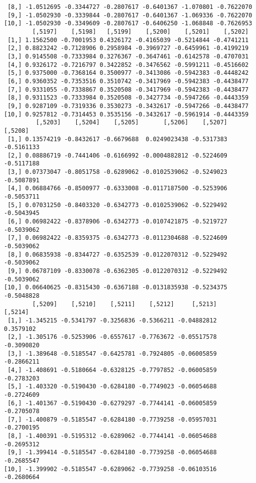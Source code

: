 \documentclass[
  letterpaper,
  DIV=11,
  numbers=noendperiod]{scrreprt}
\begin{document}
\begin{verbatim}
 [8,] -1.0512695 -0.3344727 -0.2807617 -0.6401367 -1.070801 -0.7622070
 [9,] -1.0502930 -0.3339844 -0.2807617 -0.6401367 -1.069336 -0.7622070
[10,] -1.0502930 -0.3349609 -0.2807617 -0.6406250 -1.068848 -0.7626953
        [,5197]    [,5198]   [,5199]    [,5200]    [,5201]    [,5202]
 [1,] 1.1562500 -0.7001953 0.4326172 -0.4165039 -0.5214844 -0.4741211
 [2,] 0.8823242 -0.7128906 0.2958984 -0.3969727 -0.6459961 -0.4199219
 [3,] 0.9145508 -0.7333984 0.3276367 -0.3647461 -0.6142578 -0.4707031
 [4,] 0.9326172 -0.7216797 0.3422852 -0.3476562 -0.5991211 -0.4516602
 [5,] 0.9375000 -0.7368164 0.3500977 -0.3413086 -0.5942383 -0.4448242
 [6,] 0.9360352 -0.7353516 0.3510742 -0.3417969 -0.5942383 -0.4438477
 [7,] 0.9331055 -0.7338867 0.3520508 -0.3417969 -0.5942383 -0.4438477
 [8,] 0.9311523 -0.7333984 0.3520508 -0.3427734 -0.5947266 -0.4443359
 [9,] 0.9287109 -0.7319336 0.3530273 -0.3432617 -0.5947266 -0.4438477
[10,] 0.9257812 -0.7314453 0.3535156 -0.3432617 -0.5961914 -0.4443359
         [,5203]    [,5204]    [,5205]       [,5206]    [,5207]    [,5208]
 [1,] 0.13574219 -0.8432617 -0.6679688  0.0249023438 -0.5317383 -0.5161133
 [2,] 0.08886719 -0.7441406 -0.6166992 -0.0004882812 -0.5224609 -0.5117188
 [3,] 0.07373047 -0.8051758 -0.6289062 -0.0102539062 -0.5249023 -0.5087891
 [4,] 0.06884766 -0.8500977 -0.6333008 -0.0117187500 -0.5253906 -0.5053711
 [5,] 0.07031250 -0.8403320 -0.6342773 -0.0102539062 -0.5229492 -0.5043945
 [6,] 0.06982422 -0.8378906 -0.6342773 -0.0107421875 -0.5219727 -0.5039062
 [7,] 0.06982422 -0.8359375 -0.6342773 -0.0112304688 -0.5224609 -0.5039062
 [8,] 0.06835938 -0.8344727 -0.6352539 -0.0122070312 -0.5229492 -0.5039062
 [9,] 0.06787109 -0.8330078 -0.6362305 -0.0122070312 -0.5229492 -0.5039062
[10,] 0.06640625 -0.8315430 -0.6367188 -0.0131835938 -0.5234375 -0.5048828
        [,5209]    [,5210]    [,5211]    [,5212]     [,5213]    [,5214]
 [1,] -1.345215 -0.5341797 -0.3256836 -0.5366211 -0.04882812  0.3579102
 [2,] -1.305176 -0.5253906 -0.6557617 -0.7763672 -0.05517578 -0.3090820
 [3,] -1.389648 -0.5185547 -0.6425781 -0.7924805 -0.06005859 -0.2866211
 [4,] -1.408691 -0.5180664 -0.6328125 -0.7797852 -0.06005859 -0.2783203
 [5,] -1.403320 -0.5190430 -0.6284180 -0.7749023 -0.06054688 -0.2724609
 [6,] -1.401367 -0.5190430 -0.6279297 -0.7744141 -0.06005859 -0.2705078
 [7,] -1.400879 -0.5185547 -0.6284180 -0.7739258 -0.05957031 -0.2700195
 [8,] -1.400391 -0.5195312 -0.6289062 -0.7744141 -0.06054688 -0.2695312
 [9,] -1.399414 -0.5185547 -0.6284180 -0.7739258 -0.06054688 -0.2685547
[10,] -1.399902 -0.5185547 -0.6289062 -0.7739258 -0.06103516 -0.2680664

\end{verbatim}
\end{document}
